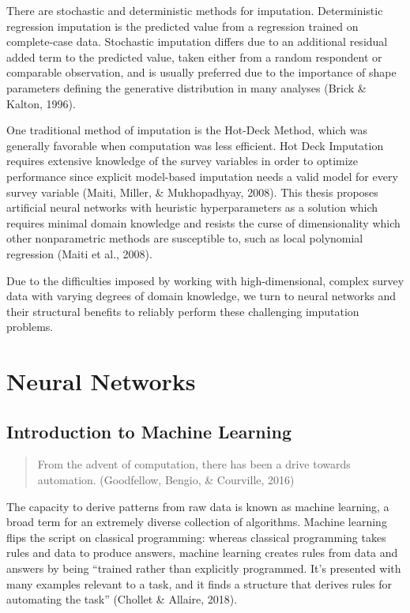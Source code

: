 \documentclass[12pt,twoside]{reedthesis}
\begin{document}
There are stochastic and deterministic methods for imputation.
Deterministic regression imputation is the predicted value from a
regression trained on complete-case data. Stochastic imputation differs
due to an additional residual added term to the predicted value, taken
either from a random respondent or comparable observation, and is
usually preferred due to the importance of shape parameters defining the
generative distribution in many analyses (Brick \& Kalton, 1996).

One traditional method of imputation is the Hot-Deck Method, which was
generally favorable when computation was less efficient. Hot Deck
Imputation requires extensive knowledge of the survey variables in order
to optimize performance since explicit model-based imputation needs a
valid model for every survey variable (Maiti, Miller, \& Mukhopadhyay,
2008). This thesis proposes artificial neural networks with heuristic
hyperparameters as a solution which requires minimal domain knowledge
and resists the curse of dimensionality which other nonparametric
methods are susceptible to, such as local polynomial regression (Maiti
et al., 2008).

Due to the difficulties imposed by working with high-dimensional,
complex survey data with varying degrees of domain knowledge, we turn to
neural networks and their structural benefits to reliably perform these
challenging imputation problems.

\chapter{Neural Networks}\label{math-sci}

\section{Introduction to Machine
Learning}\label{introduction-to-machine-learning}
\begin{quote}
From the advent of computation, there has been a drive towards
automation. (Goodfellow, Bengio, \& Courville, 2016)
\end{quote}
The capacity to derive patterns from raw data is known as machine
learning, a broad term for an extremely diverse collection of
algorithms. Machine learning flips the script on classical programming:
whereas classical programming takes rules and data to produce answers,
machine learning creates rules from data and answers by being ``trained
rather than explicitly programmed. It's presented with many examples
relevant to a task, and it finds a structure that derives rules for
automating the task'' (Chollet \& Allaire, 2018).
\end{document}
